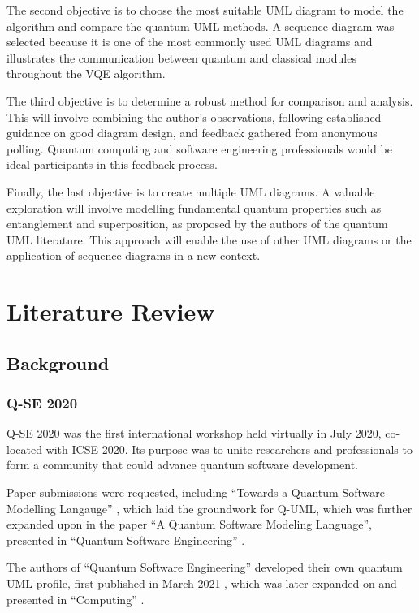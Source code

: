 \documentclass{article}
\begin{document}
The second objective is to choose the most suitable UML diagram to model the algorithm and compare the quantum UML methods. A sequence diagram was selected because it is one of the most commonly used UML diagrams and illustrates the communication between quantum and classical modules throughout the VQE algorithm.

The third objective is to determine a robust method for comparison and analysis. This will involve combining the author’s observations, following established guidance on good diagram design, and feedback gathered from anonymous polling. Quantum computing and software engineering professionals would be ideal participants in this feedback process.

Finally, the last objective is to create multiple UML diagrams. A valuable exploration will involve modelling fundamental quantum properties such as entanglement and superposition, as proposed by the authors of the quantum UML literature. This approach will enable the use of other UML diagrams or the application of sequence diagrams in a new context. 

\section{Literature Review}

\subsection{Background}

\subsubsection{Q-SE 2020}

Q-SE 2020 was the first international workshop held virtually in July 2020, co-located with ICSE 2020. Its purpose was to unite researchers and professionals to form a community that could advance quantum software development. 

Paper submissions were requested, including “Towards a Quantum Software Modelling Langauge” \cite{Perez-Delgado2020}, which laid the groundwork for Q-UML, which was further expanded upon in the paper “A Quantum Software Modeling Language”, presented in “Quantum Software Engineering” \cite{serrano2022quantum}.

The authors of “Quantum Software Engineering” \cite{serrano2022quantum} developed their own quantum UML profile, first published in March 2021 \cite{Pérez-Castillo2021}, which was later expanded on and presented in “Computing” \cite{Pérez-Castillo2022}.
\end{document}
